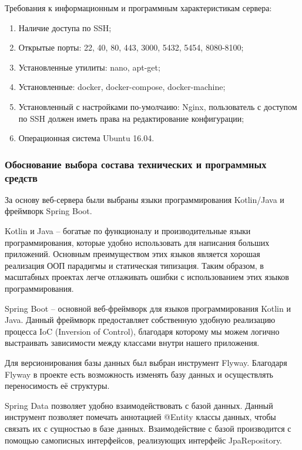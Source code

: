 \documentclass{../includes/TechDoc}
\begin{document}
	Требования к информационным и программным характеристикам сервера:
	\begin{enumerate}[noitemsep]
	    \item Наличие доступа по SSH;
	    \item Открытые порты: 22, 40, 80, 443, 3000, 5432, 5454, 8080-8100;
	    \item Установленные утилиты: nano, apt-get;
	    \item Установленные: docker, docker-compose, docker-machine;
	    \item Установленный с настройками по-умолчаию: Nginx, пользователь с доступом по SSH должен иметь права
	    на редактирование конфигурации;
	    \item Операционная система Ubuntu 16.04.
	\end{enumerate}

    \subsubsection{Обоснование выбора состава технических и программных средств}

    За основу веб-сервера были выбраны языки программирования Kotlin/Java и фреймворк Spring Boot.

    Kotlin и Java -- богатые по функционалу и производительные языки программирования, которые удобно использовать для написания больших приложений.
    Основным преимуществом этих языков является хорошая реализация ООП парадигмы и статическая типизация.
    Таким образом, в масштабных проектах легче отлаживать ошибки с использованием этих языков программирования.

    Spring Boot -- основной веб-фреймворк для языков программирования Kotlin и Java.
    Данный фреймворк предоставляет собственную удобную реализацию процесса IoC (Inversion of Control), благодаря которому мы можем логично выстраивать зависимости между классами внутри нашего приложения.

    Для версионирования базы данных был выбран инструмент Flyway.
    Благодаря Flyway в проекте есть возможность изменять базу данных и осуществлять переносимость её структуры.

    Spring Data позволяет удобно взаимодействовать с базой данных.
    Данный инструмент позволяет помечать аннотацией @Entity классы данных, чтобы связать их с сущностью в базе данных.
    Взаимодействие с базой производится с помощью самописных интерфейсов, реализующих интерфейс JpaRepository.
\end{document}

